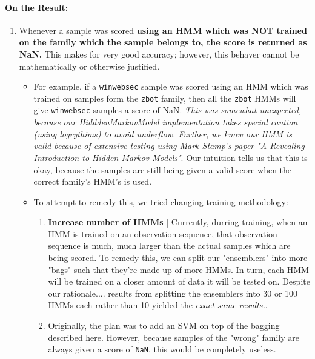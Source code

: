\documentclass[12pt]{article}
\begin{document}
  \paragraph{On the Result:}
  \begin{enumerate}
    \item Whenever a sample was scored \textbf{using an HMM which was NOT trained on the family which the sample belongs to, the score is returned as NaN.} This makes for very good accuracy; however, this behaver cannot be mathematically or otherwise justified.
      \begin{itemize}
        \item For example, if a \texttt{winwebsec} sample was scored using an HMM which was trained on samples form the \texttt{zbot} family, then all the \texttt{zbot} HMMs will give \texttt{winwebsec} samples a score of NaN. \textit{This was somewhat unexpected, because our HidddenMarkovModel implementation takes special caution (using logrythims) to avoid underflow. Further, we know our HMM is valid because of extensive testing using Mark Stamp's paper "A Revealing Introduction to Hidden Markov Models"}. Our intuition tells us that this is okay, because the samples are still being given a valid score when the correct family's HMM's is used.
        \item To attempt to remedy this, we tried changing training methodology:
          \begin{enumerate}
            \item \textbf{Increase number of HMMs} | Currently, durring training, when an HMM is trained on an observation sequence, that observation sequence is much, much larger than the actual samples which are being scored. To remedy this, we can split our "ensemblers" into more "bags" such that they're made up of more HMMs. In turn, each HMM will be trained on a closer amount of data it will be tested on. Despite our rationale.... results from splitting the ensemblers into 30 or 100 HMMs each rather than 10 yielded the \textit{exact same results.}.
        \item Originally, the plan was to add an SVM on top of the bagging described here. However, because samples of the "wrong" family are always given a score of \texttt{NaN}, this would be completely useless.
          \end{enumerate}
     \end{itemize}
  \end{enumerate}
\end{document}
